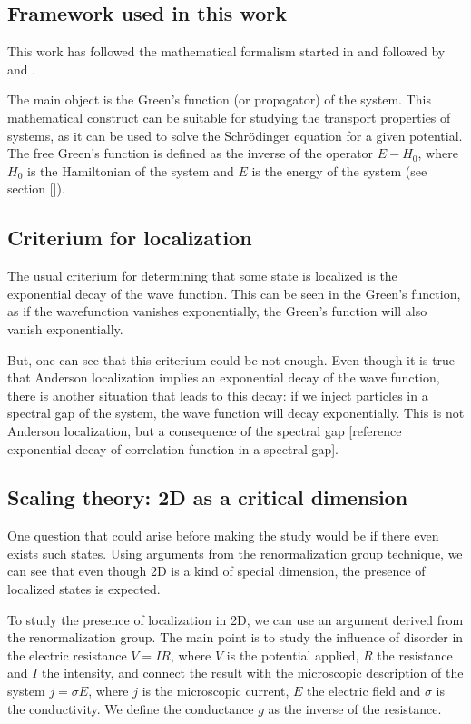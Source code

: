

\subsection{Framework used in this work}

This work has followed the mathematical formalism started in \cite{gavishMatterwave2005} and followed by \cite{massignanThreedimensional2006} and \cite{antezzaQuantitativeStudyTwo2010}. 

The main object is the Green's function (or propagator) of the system. This mathematical construct can be suitable for studying the transport properties of systems, as it can be used to solve the Schrödinger equation for a given potential. The free Green's function is defined as the inverse of the operator $E-H_0$, where $H_0$ is the Hamiltonian of the system and $E$ is the energy of the system (see section []). 

\subsection{Criterium for localization}

The usual criterium for determining that some state is localized is the exponential decay of the wave function. This can be seen in the Green's function, as if the wavefunction vanishes exponentially, the Green's function will also vanish exponentially.

But, one can see that this criterium could be not enough. Even though it is true that Anderson localization implies an exponential decay of the wave function, there is another situation that leads to this decay: if we inject particles in a spectral gap of the system, the wave function will decay exponentially. This is not Anderson localization, but a consequence of the spectral gap [reference exponential decay of correlation function in a spectral gap].

\subsection{Scaling theory: 2D as a critical dimension}

One question that could arise before making the study would be if there even exists such states. Using arguments from the renormalization group technique, we can see that even though 2D is a kind of special dimension, the presence of localized states is expected.

To study the presence of localization in 2D, we can use an argument derived from the renormalization group. The main point is to study the influence of disorder in the electric resistance $V=IR$, where $V$ is the potential applied, $R$ the resistance and $I$ the intensity, and connect the result with the microscopic description of the system $j=\sigma E$, where $j$ is the microscopic current, $E$ the electric field and $\sigma$ is the conductivity. We define the conductance $g$ as the inverse of the resistance. 


